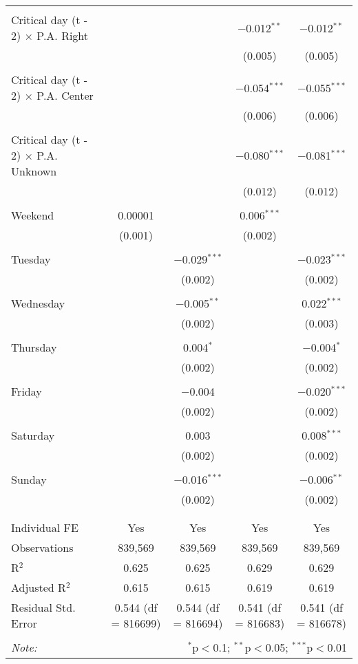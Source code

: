 \documentclass[
]{article}
\begin{document}
\begin{table}[!htbp]
{\begin{tabular}{@{\extracolsep{5pt}}lcccc}
  & & & & \\ 
 Critical day (t - 2) $\times$ P.A. Right &  &  & $-$0.012$^{**}$ & $-$0.012$^{**}$ \\ 
  &  &  & (0.005) & (0.005) \\ 
  & & & & \\ 
 Critical day (t - 2) $\times$ P.A. Center &  &  & $-$0.054$^{***}$ & $-$0.055$^{***}$ \\ 
  &  &  & (0.006) & (0.006) \\ 
  & & & & \\ 
 Critical day (t - 2) $\times$ P.A. Unknown &  &  & $-$0.080$^{***}$ & $-$0.081$^{***}$ \\ 
  &  &  & (0.012) & (0.012) \\ 
  & & & & \\ 
 Weekend & 0.00001 &  & 0.006$^{***}$ &  \\ 
  & (0.001) &  & (0.002) &  \\ 
  & & & & \\ 
 Tuesday &  & $-$0.029$^{***}$ &  & $-$0.023$^{***}$ \\ 
  &  & (0.002) &  & (0.002) \\ 
  & & & & \\ 
 Wednesday &  & $-$0.005$^{**}$ &  & 0.022$^{***}$ \\ 
  &  & (0.002) &  & (0.003) \\ 
  & & & & \\ 
 Thursday &  & 0.004$^{*}$ &  & $-$0.004$^{*}$ \\ 
  &  & (0.002) &  & (0.002) \\ 
  & & & & \\ 
 Friday &  & $-$0.004 &  & $-$0.020$^{***}$ \\ 
  &  & (0.002) &  & (0.002) \\ 
  & & & & \\ 
 Saturday &  & 0.003 &  & 0.008$^{***}$ \\ 
  &  & (0.002) &  & (0.002) \\ 
  & & & & \\ 
 Sunday &  & $-$0.016$^{***}$ &  & $-$0.006$^{**}$ \\ 
  &  & (0.002) &  & (0.002) \\ 
  & & & & \\ 
\hline \\[-1.8ex] 
Individual FE & Yes & Yes & Yes & Yes \\ 
Observations & 839,569 & 839,569 & 839,569 & 839,569 \\ 
R$^{2}$ & 0.625 & 0.625 & 0.629 & 0.629 \\ 
Adjusted R$^{2}$ & 0.615 & 0.615 & 0.619 & 0.619 \\ 
Residual Std. Error & 0.544 (df = 816699) & 0.544 (df = 816694) & 0.541 (df = 816683) & 0.541 (df = 816678) \\ 
\hline 
\hline \\[-1.8ex] 
\textit{Note:}  & \multicolumn{4}{r}{$^{*}$p$<$0.1; $^{**}$p$<$0.05; $^{***}$p$<$0.01} \\ 
\end{tabular}
} 
\end{table} 
\newpage
\end{document}
